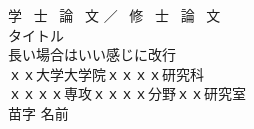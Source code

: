 \begin{titlepage}


\vspace*{120truept}
\begin{center}
  \huge{学 \ 士 \ 論 \ 文 ／ \ 修 \ 士 \ 論 \ 文}\\
  \vspace{30truept}
  \huge{タイトル\\長い場合はいい感じに改行}\\ %
\vspace{100truept}
\LARGE{ｘｘ大学大学院ｘｘｘｘ研究科}\\
\LARGE{ｘｘｘｘ専攻ｘｘｘｘ分野ｘｘ研究室}\\
\LARGE{苗字 名前}\\
\end{center}


\end{titlepage}
